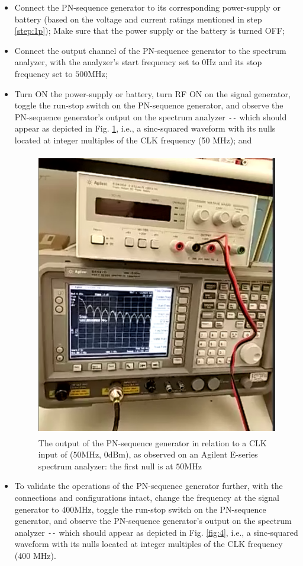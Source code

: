 \documentclass[12pt, draftcls, onecolumn]{IEEEtran}
\begin{document}
\begin{enumerate}
\begin{itemize}
        \item Connect the PN-sequence generator to its corresponding power-supply or battery (based on the voltage and current ratings mentioned in step \ref{step:1p}); Make sure that the power supply or the battery is turned OFF;
        \item Connect the output channel of the PN-sequence generator to the spectrum analyzer, with the analyzer's start frequency set to $0$Hz and its stop frequency set to $500$MHz;
        \item Turn ON the power-supply or battery, turn RF ON on the signal generator, toggle the run-stop switch on the PN-sequence generator, and observe the PN-sequence generator's output on the spectrum analyzer \texttt{-{}-} which should appear as depicted in Fig. \ref{fig:3}, i.e., a sinc-squared waveform with its nulls located at integer multiples of the CLK frequency (50 MHz); and
        \begin{figure}
            \centering
            \includegraphics[width=15cm, height=12.5cm]{3.png}
            \caption{The output of the PN-sequence generator in relation to a CLK input of ($50$MHz, $0$dBm), as observed on an Agilent E-series spectrum analyzer: the first null is at $50$MHz}
            \label{fig:3}
        \end{figure}
        \item To validate the operations of the PN-sequence generator further, with the connections and configurations intact, change the frequency at the signal generator to $400$MHz, toggle the run-stop switch on the PN-sequence generator, and observe the PN-sequence generator's output on the spectrum analyzer \texttt{-{}-} which should appear as depicted in Fig. \ref{fig:4}, i.e., a sinc-squared waveform with its nulls located at integer multiples of the CLK frequency (400 MHz).

\end{itemize}
\end{enumerate}
\end{document}
